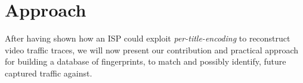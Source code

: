 \chapter{Approach}\label{sec:approach}

After having shown how an ISP could exploit \emph{per-title-encoding} to
reconstruct video traffic traces, we will now present our contribution and
practical approach for building a database of fingerprints, to match and
possibly identify, future captured traffic against.


